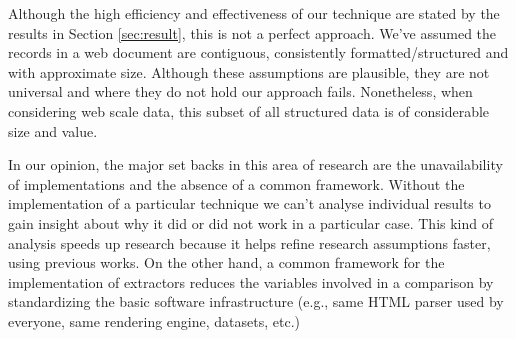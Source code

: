 \documentclass{vldb}
\begin{document}
Although the high efficiency and effectiveness of our technique are stated by
the results in Section \ref{sec:result}, this is not a perfect approach. We've
assumed the records in a web document are contiguous, consistently
formatted/structured and with approximate size. Although these assumptions are
plausible, they are not universal and where they do not hold our approach fails.
Nonetheless, when considering web scale data, this subset of all structured data
is of considerable size and value.

In our opinion, the major set backs in this area of research are the
unavailability of implementations and the absence of a common framework.
Without the implementation of a particular technique we can't analyse individual
results to gain insight about why it did or did not work in a particular case.
This kind of analysis speeds up research because it helps refine research
assumptions faster, using previous works. On the other hand, a common framework
for the implementation of extractors reduces the variables involved in a
comparison by standardizing the basic software infrastructure (e.g., same HTML
parser used by everyone, same rendering engine, datasets, etc.)
 
\end{document}
